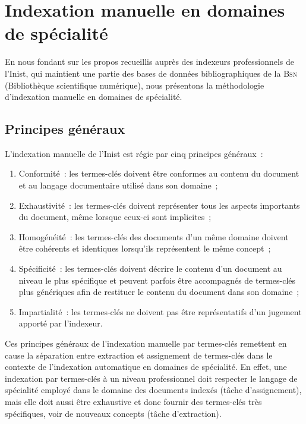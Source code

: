 
  \section{Indexation manuelle en domaines de spécialité}
  \label{sec:main-domain_specific_keyphrase_annotation-manual_keyphrase_annotation}
    En nous fondant sur les  propos recueillis auprès des indexeurs
    professionnels de l'Inist, qui maintient une partie des bases de données
    bibliographiques de la \textsc{Bsn} (Bibliothèque scientifique numérique),
    nous présentons la méthodologie d'indexation manuelle en domaines de
    spécialité.

    \subsection{Principes généraux}
    \label{subsec:main-domain_specific_keyphrase_annotation-manual_keyphrase_annotation-principles}
      L'indexation manuelle de l'Inist est régie par cinq principes généraux~:
      \begin{enumerate}
        \item{Conformité~: les termes-clés doivent être conformes au contenu du
              document et au langage documentaire utilisé dans son domaine~;}
        \item{Exhaustivité~: les termes-clés doivent représenter tous les
              aspects importants du document, même lorsque ceux-ci sont
              implicites~;}
        \item{Homogénéité~: les termes-clés des documents d'un même domaine
              doivent être cohérents et identiques lorsqu'ils représentent le
              même concept~;}
        \item{Spécificité~: les termes-clés doivent décrire le contenu d'un
              document au niveau le plus spécifique et peuvent
              parfois être accompagnés de termes-clés plus génériques afin de
              restituer le contenu du document dans son domaine~;}
        \item{Impartialité~: les termes-clés ne doivent pas être représentatifs
              d'un jugement apporté par l'indexeur.}
      \end{enumerate}

      Ces principes généraux de l'indexation manuelle par termes-clés remettent
      en cause la séparation entre extraction et assignement de termes-clés dans
      le contexte de l'indexation automatique en domaines de spécialité. En
      effet, une indexation par termes-clés à un niveau professionnel doit
      respecter le langage de spécialité employé dans le domaine des documents
      indexés (tâche d'assignement), mais elle doit aussi être exhaustive et
      donc fournir des termes-clés très spécifiques, voir de nouveaux concepts
      (tâche d'extraction).

